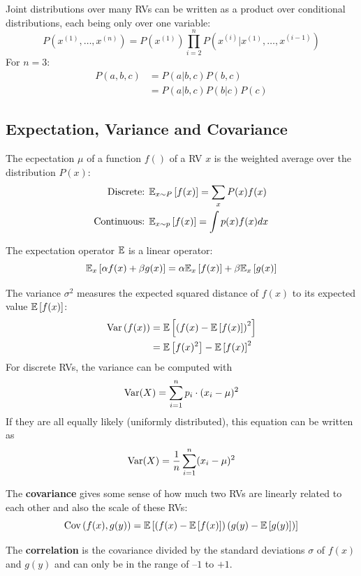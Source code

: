 \begin{multicols}{2}
	Joint distributions over many RVs can be written as a product over conditional distributions, each being only over one variable:
	\[ P\left(x^{(1)},\dots,x^{(n)}\right) = P(x^{(1)}) \prod_{i=2}^{n} P\left( x^{(i)}|x^{(1)},\dots,x^{(i-1)} \right) \]
	For $n=3$:
	\begin{align*}
	P(a,b,c)
	&= P(a|b,c)P(b,c)\\
	&= P(a|b,c)P(b|c)P(c)
	\end{align*}
	
	\subsection{Expectation, Variance and Covariance}
	The ecpectation $\mu$ of a function $f()$ of a RV $x$ is the weighted average over the distribution $P(x)$:
	\begin{align*}
	\text{Discrete: }  &\mathbb{E}_{x\sim P}\left[f(x)\right] = \sum_x P(x)f(x)\\
	\text{Continuous: }  &\mathbb{E}_{x\sim p}\left[f(x)\right] = \int p(x)f(x)dx
	\end{align*}
	
	The expectation operator $\mathbb{E}$ is a linear operator:
	\[ \mathbb{E}_x \left[ \alpha f(x) + \beta g(x) \right] = \alpha\mathbb{E}_x \left[f(x)\right] + \beta\mathbb{E}_x \left[g(x)\right]\]
	
	The variance $\sigma^2$ measures the expected squared distance of $f(x)$ to its expected value $\mathbb{E}\left[f(x)\right]$:
	\begin{align*}
	\text{Var}\left( f(x) \right) &= \mathbb{E} \left[ \left( f(x) - \mathbb{E} \left[ f(x) \right] \right)^2 \right]\\
	&= \mathbb{E} \left[ f(x)^2 \right] - \mathbb{E} \left[ f(x) \right]^2
	\end{align*}
	For discrete RVs, the variance can be computed with
	\[ \text{Var}(X) = \sum_{i=1}^{n} p_i \cdot (x_i-\mu)^2 \]
	If they are all equally likely (uniformly distributed), this equation can be written as
	\[ \text{Var}(X) = \frac{1}{n} \sum_{i=1}^{n} (x_i-\mu )^2 \]
	
	The \textbf{covariance} gives some sense of how much two RVs are linearly related to each other and also the scale of these RVs:
	\[ \text{Cov}\left( f(x),g(y) \right) = 
	\mathbb{E} \left[ \left( f(x) -\mathbb{E} \left[ f(x) \right] \right)\left( g(y) -\mathbb{E} \left[ g(y) \right] \right) \right] \]
	
	The \textbf{correlation} is the covariance divided by the standard deviations $\sigma$ of $f(x)$ and $g(y)$ and can only be in the range of $–1$ to $+1$.\\
	

\end{multicols}
